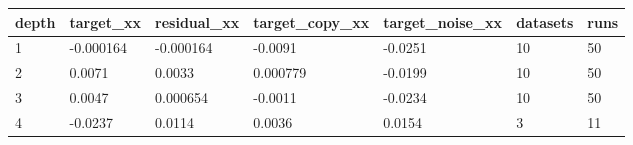 \begin{tabular}{lllllll}
\toprule
depth & target\_xx & residual\_xx & target\_copy\_xx & target\_noise\_xx & datasets & runs \\
\midrule
1 & -0.000164 & -0.000164 & -0.0091 & -0.0251 & 10 & 50 \\
2 & 0.0071 & 0.0033 & 0.000779 & -0.0199 & 10 & 50 \\
3 & 0.0047 & 0.000654 & -0.0011 & -0.0234 & 10 & 50 \\
4 & -0.0237 & 0.0114 & 0.0036 & 0.0154 & 3 & 11 \\
\bottomrule
\end{tabular}

